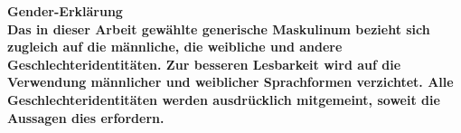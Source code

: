 \thispagestyle{empty}
\begin{center}
	\vspace*{2cm}
	\Huge\bf Gender-Erklärung\\
	\vspace*{3cm}
	\normalsize\rm
	Das in dieser Arbeit gewählte generische Maskulinum bezieht sich zugleich auf die männliche, die weibliche und andere Geschlechteridentitäten. Zur besseren Lesbarkeit wird auf die Verwendung männlicher und weiblicher Sprachformen verzichtet. Alle Geschlechteridentitäten werden ausdrücklich mitgemeint, soweit die Aussagen dies erfordern.\\
\end{center}

\newpage
